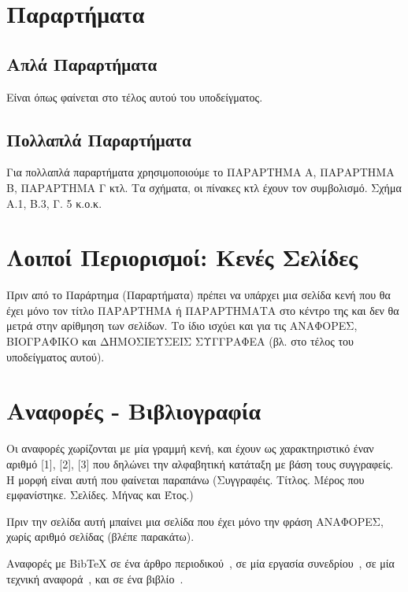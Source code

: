 \section{Παραρτήματα}
\label{sec:Appendices}

\subsection{Απλά Παραρτήματα}
\label{subsec:SimpleAppendices}

Είναι όπως φαίνεται στο τέλος αυτού του υποδείγματος.

\subsection{Πολλαπλά Παραρτήματα}
\label{subsec:MultipleAppendices}

Για πολλαπλά παραρτήματα χρησιμοποιούμε το ΠΑΡΑΡΤΗΜΑ Α, ΠΑΡΑΡΤΗΜΑ
Β, ΠΑΡΑΡΤΗΜΑ Γ κτλ. Τα σχήματα, οι πίνακες κτλ έχουν τον
συμβολισμό. Σχήμα Α.1, Β.3, Γ. 5 κ.ο.κ.



\section{Λοιποί Περιορισμοί: Κενές Σελίδες}
\label{sec:Restrictions}

Πριν από το Παράρτημα (Παραρτήματα) πρέπει να υπάρχει μια σελίδα
κενή που θα έχει μόνο τον τίτλο ΠΑΡΑΡΤΗΜΑ ή ΠΑΡΑΡΤΗΜΑΤΑ στο κέντρο
της και δεν θα μετρά στην αρίθμηση των σελίδων.  Το ίδιο ισχύει
και για τις ΑΝΑΦΟΡΕΣ, ΒΙΟΓΡΑΦΙΚΟ και ΔΗΜΟΣΙΕΥΣΕΙΣ ΣΥΓΓΡΑΦΕΑ (βλ.
στο τέλος του υποδείγματος αυτού).


\section{Αναφορές - Βιβλιογραφία}
\label{sec:Bibliography}

Οι αναφορές χωρίζονται με μία γραμμή κενή, και έχουν ως
χαρακτηριστικό έναν αριθμό [1], [2], [3] που δηλώνει την
αλφαβητική κατάταξη με βάση τους συγγραφείς. Η μορφή είναι αυτή
που φαίνεται παραπάνω (Συγγραφέις. Τίτλος. Μέρος που εμφανίστηκε.
Σελίδες. Μήνας και Έτος.)

Πριν την σελίδα αυτή μπαίνει μια σελίδα που έχει μόνο την φράση
ΑΝΑΦΟΡΕΣ, χωρίς αριθμό σελίδας (βλέπε παρακάτω).

\color{black}
Αναφορές με BibTeX σε ένα άρθρο περιοδικού~\cite{Newman2003a}, σε μία εργασία συνεδρίου~\cite{DeCandia2007a}, σε μία τεχνική αναφορά~\cite{Jain1984a}, και σε ένα βιβλίο~\cite{Golumbic2004a}.


